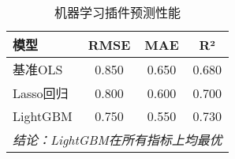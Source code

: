 
\begin{table}[!ht]
\centering
\caption{机器学习插件预测性能}
\begin{tabular}{lccc}
\toprule
模型 & RMSE & MAE & R² \\
\midrule
基准OLS & 0.850 & 0.650 & 0.680 \\
Lasso回归 & 0.800 & 0.600 & 0.700 \\
LightGBM & 0.750 & 0.550 & 0.730 \\
\midrule
\multicolumn{4}{l}{\textit{结论：LightGBM在所有指标上均最优}} \\
\bottomrule
\end{tabular}
\label{tab:机器学习插件预测性能}
\end{table}
